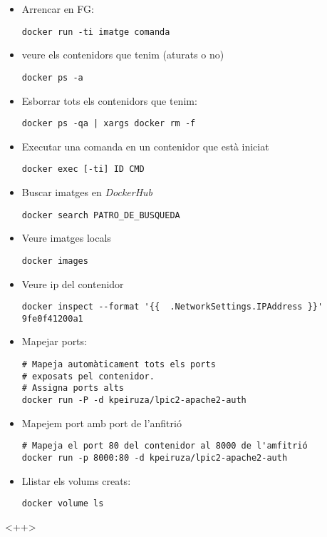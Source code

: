\documentclass[a4paper]{article}
\begin{document}
\begin{itemize}
	\item Arrencar en FG:
		\begin{lstlisting}
docker run -ti imatge comanda
		\end{lstlisting}
	\item veure els contenidors que tenim (aturats o no)
		\begin{lstlisting}
docker ps -a
		\end{lstlisting}
	\item Esborrar tots els contenidors que tenim:
		\begin{lstlisting}
docker ps -qa | xargs docker rm -f
		\end{lstlisting}
	\item Executar una comanda en un contenidor que està iniciat
		\begin{lstlisting}
docker exec [-ti] ID CMD
		\end{lstlisting}
	\item Buscar imatges en \textit{DockerHub}
		\begin{lstlisting}
docker search PATRO_DE_BUSQUEDA
		\end{lstlisting}
	\item Veure imatges locals
		\begin{lstlisting}
docker images
		\end{lstlisting}
	\item Veure ip del contenidor
		\begin{lstlisting}
docker inspect --format '{{  .NetworkSettings.IPAddress }}' 9fe0f41200a1 
		\end{lstlisting}
	\item Mapejar ports:
		\begin{lstlisting}
# Mapeja automàticament tots els ports 
# exposats pel contenidor. 
# Assigna ports alts
docker run -P -d kpeiruza/lpic2-apache2-auth
		\end{lstlisting}
	\item Mapejem port amb port de l'anfitrió
		\begin{lstlisting}
# Mapeja el port 80 del contenidor al 8000 de l'amfitrió
docker run -p 8000:80 -d kpeiruza/lpic2-apache2-auth
		\end{lstlisting}

		
	\item Llistar els volums creats:
		\begin{lstlisting}
docker volume ls
		\end{lstlisting}
\end{itemize}<++>
\end{document}
